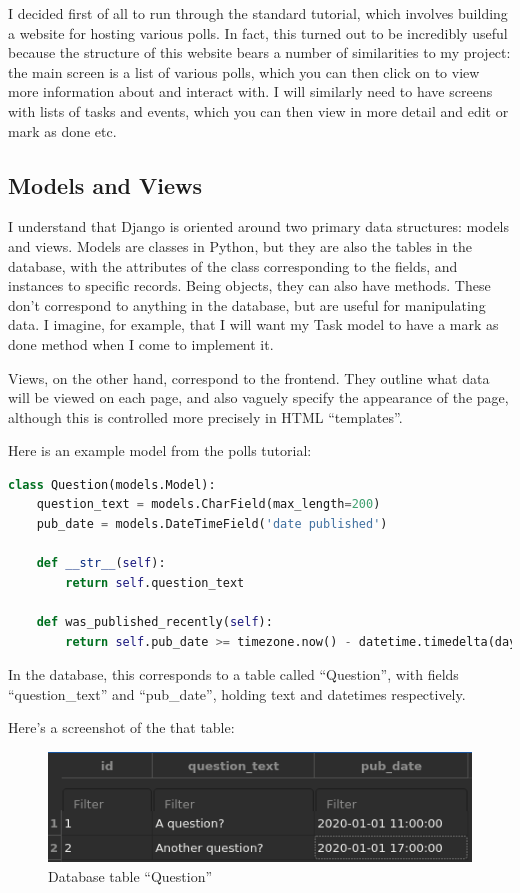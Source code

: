\documentclass{article}
\begin{document}
I decided first of all to run through the standard tutorial,
which involves building a website for hosting various polls.
In fact, this turned out to be incredibly useful because the structure of this website bears a number of similarities to my project:
the main screen is a list of various polls,
which you can then click on to view more information about and interact with.
I will similarly need to have screens with lists of tasks and events,
which you can then view in more detail and edit or mark as done etc.

\subsection{Models and Views}
I understand that Django is oriented around two primary data structures:
models and views.
Models are classes in Python,
but they are also the tables in the database,
with the attributes of the class corresponding to the fields,
and instances to specific records.
Being objects, they can also have methods.
These don't correspond to anything in the database,
but are useful for manipulating data.
I imagine, for example, that I will want my Task model to have a mark as done method when I come to implement it.

Views, on the other hand, correspond to the frontend.
They outline what data will be viewed on each page,
and also vaguely specify the appearance of the page,
although this is controlled more precisely in HTML ``templates''.

Here is an example model from the polls tutorial:
\begin{lstlisting}[language=Python]
class Question(models.Model):
    question_text = models.CharField(max_length=200)
    pub_date = models.DateTimeField('date published')

    def __str__(self):
        return self.question_text

    def was_published_recently(self):
        return self.pub_date >= timezone.now() - datetime.timedelta(days=1)
\end{lstlisting}

In the database,
this corresponds to a table called ``Question'',
with fields ``question\_text'' and ``pub\_date'',
holding text and datetimes respectively.

Here's a screenshot of the that table:

\begin{figure}[h!]
  \includegraphics[width=\linewidth]{Images/question_table.png}
  \caption{Database table ``Question''}
  \label{fig:database1}
\end{figure}
\end{document}
